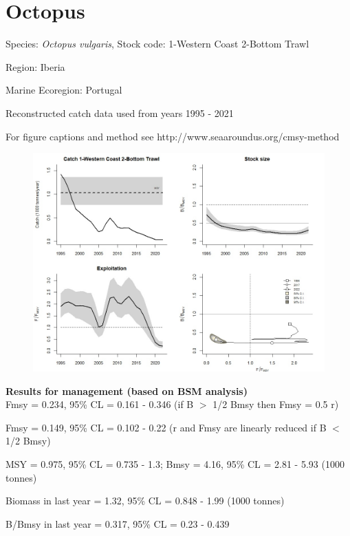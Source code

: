 \documentclass[12pt,a4paper]{article}\usepackage[]{graphicx}\usepackage[]{xcolor}
\begin{document}
    \section*{Octopus}


    Species: \emph{Octopus vulgaris}, Stock code: 1-Western Coast 2-Bottom Trawl

Region: Iberia

Marine Ecoregion: Portugal

Reconstructed catch data used from years 1995 - 2021 

 For figure captions and method see http://www.seaaroundus.org/cmsy-method

    \begin{figure}[ht]
    \centering
    \includegraphics[width=1.00\textwidth ext=.jpg type=jpg]{1-Western Coast 2-Bottom Trawl_MAN.jpg}
    \end{figure}

    \textbf{Results for management (based on BSM analysis)}\\

Fmsy = 0.234, 95\% CL = 0.161 - 0.346 (if B $>$ 1/2 Bmsy then Fmsy = 0.5 r)

Fmsy = 0.149, 95\% CL = 0.102 - 0.22 (r and Fmsy are linearly reduced if B $<$ 1/2 Bmsy)

MSY = 0.975,  95\% CL = 0.735 - 1.3; Bmsy = 4.16,  95\% CL = 2.81 - 5.93 (1000 tonnes)

Biomass in last year = 1.32, 95\% CL = 0.848 - 1.99 (1000 tonnes)

B/Bmsy in last year = 0.317, 95\% CL = 0.23 - 0.439
\end{document}
